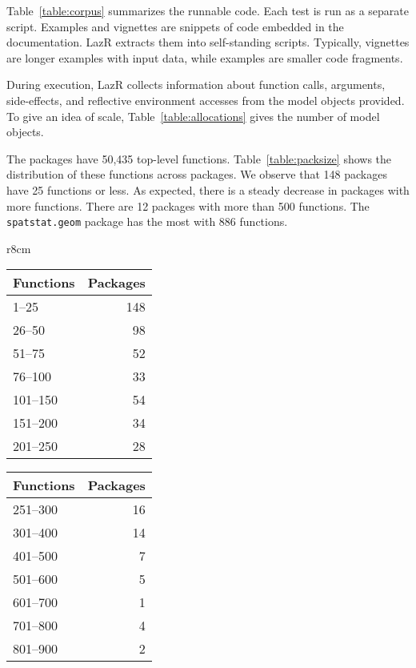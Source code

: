 \documentclass[review,creen,acmsmall]{acmart}
\renewcommand{\c}[1]{\lstinline |#1|\xspace}
\newcommand{\lazr}{{\sf LazR}\xspace}
\begin{document}
Table~\ref{table:corpus} summarizes the runnable code. Each test is run as a
separate script. Examples and vignettes are snippets of code embedded in the
documentation. \lazr extracts them into self-standing scripts. Typically,
vignettes are longer examples with input data, while examples are smaller code
fragments.

During execution, \lazr collects information about function calls, arguments,
side-effects, and reflective environment accesses from the model objects
provided. To give an idea of scale, Table~\ref{table:allocations} gives the
number of model objects.

The packages have 50,435 top-level functions. Table~\ref{table:packsize} shows
the distribution of these functions across packages. We observe that 148
packages have 25 functions or less. As expected, there is a steady decrease in
packages with more functions. There are 12 packages with more than 500
functions. The \c{spatstat.geom} package has the most with 886 functions.

\begin{wraptable}{r}{8cm}\small
  \caption{Package Size} \label{table:packsize}\centering
  \begin{tabular}{lr}\toprule
    \bf Functions&\bf Packages\\\midrule
    1--25&148\\
    26--50&98\\
    51--75&52\\
    76--100&33\\
    101--150&54\\
    151--200&34\\
    201--250&28\\\bottomrule
  \end{tabular}
  \quad\begin{tabular}{lr}\toprule
    \bf Functions&\bf Packages\\\midrule
    251--300&16\\
    301--400&14\\
    401--500&7\\
    501--600&5\\
    601--700&1\\
    701--800&4\\
    801--900&2\\\bottomrule
  \end{tabular}
\end{wraptable}
\end{document}
